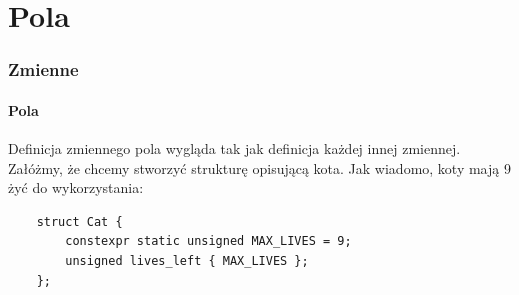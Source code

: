 \documentclass[aspectratio=169]{beamer}
\begin{document}












\section{Pola}

\begin{frame}[fragile]
    \frametitle{Zmienne}
    \framesubtitle{Pola}

    Definicja zmiennego pola wygląda tak jak definicja każdej innej zmiennej.
    Załóżmy, że chcemy stworzyć strukturę opisującą kota. Jak wiadomo, koty mają
    9 żyć do wykorzystania:

    {\small
    \begin{lstlisting}
    struct Cat {
        constexpr static unsigned MAX_LIVES = 9;
        unsigned lives_left { MAX_LIVES };
    };
    \end{lstlisting}}
\end{frame}
\end{document}
